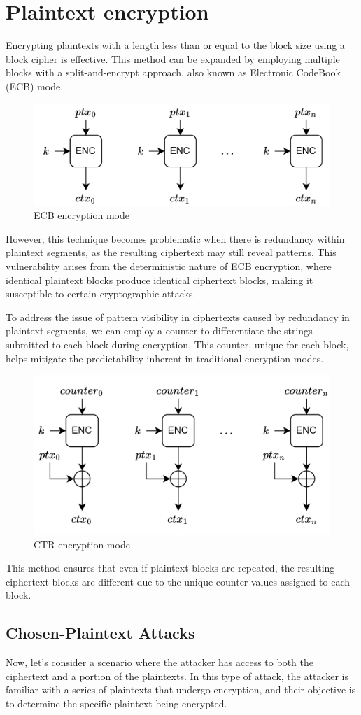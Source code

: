 \section{Plaintext encryption}

Encrypting plaintexts with a length less than or equal to the block size using a block cipher is effective.
This method can be expanded by employing multiple blocks with a split-and-encrypt approach, also known as Electronic CodeBook (ECB) mode.
\begin{figure}[H]
    \centering
    \includegraphics[width=0.55\linewidth]{images/ecb.png}
    \caption{ECB encryption mode}
\end{figure}
However, this technique becomes problematic when there is redundancy within plaintext segments, as the resulting ciphertext may still reveal patterns. 
This vulnerability arises from the deterministic nature of ECB encryption, where identical plaintext blocks produce identical ciphertext blocks, making it susceptible to certain cryptographic attacks.

To address the issue of pattern visibility in ciphertexts caused by redundancy in plaintext segments, we can employ a counter to differentiate the strings submitted to each block during encryption. 
This counter, unique for each block, helps mitigate the predictability inherent in traditional encryption modes.
\begin{figure}[H]
    \centering
    \includegraphics[width=0.55\linewidth]{images/ctr.png}
    \caption{CTR encryption mode}
\end{figure}
This method ensures that even if plaintext blocks are repeated, the resulting ciphertext blocks are different due to the unique counter values assigned to each block.

\subsection{Chosen-Plaintext Attacks}
Now, let's consider a scenario where the attacker has access to both the ciphertext and a portion of the plaintexts.
In this type of attack, the attacker is familiar with a series of plaintexts that undergo encryption, and their objective is to determine the specific plaintext being encrypted.

